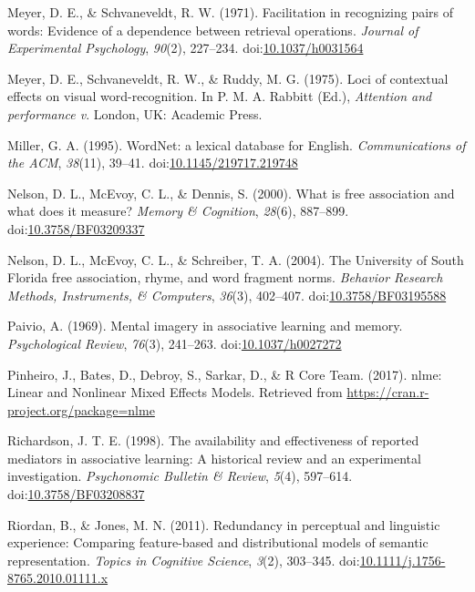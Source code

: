 \documentclass[english,man]{apa6}
\theoremstyle{definition}
\theoremstyle{definition}
\theoremstyle{definition}
\theoremstyle{remark}
\begin{document}
\hypertarget{ref-Meyer1971}{}
Meyer, D. E., \& Schvaneveldt, R. W. (1971). Facilitation in recognizing
pairs of words: Evidence of a dependence between retrieval operations.
\emph{Journal of Experimental Psychology}, \emph{90}(2), 227--234.
doi:\href{https://doi.org/10.1037/h0031564}{10.1037/h0031564}

\hypertarget{ref-Meyer1975}{}
Meyer, D. E., Schvaneveldt, R. W., \& Ruddy, M. G. (1975). Loci of
contextual effects on visual word-recognition. In P. M. A. Rabbitt
(Ed.), \emph{Attention and performance v}. London, UK: Academic Press.

\hypertarget{ref-Miller1995}{}
Miller, G. A. (1995). WordNet: a lexical database for English.
\emph{Communications of the ACM}, \emph{38}(11), 39--41.
doi:\href{https://doi.org/10.1145/219717.219748}{10.1145/219717.219748}

\hypertarget{ref-Nelson2000}{}
Nelson, D. L., McEvoy, C. L., \& Dennis, S. (2000). What is free
association and what does it measure? \emph{Memory \& Cognition},
\emph{28}(6), 887--899.
doi:\href{https://doi.org/10.3758/BF03209337}{10.3758/BF03209337}

\hypertarget{ref-Nelson2004}{}
Nelson, D. L., McEvoy, C. L., \& Schreiber, T. A. (2004). The University
of South Florida free association, rhyme, and word fragment norms.
\emph{Behavior Research Methods, Instruments, \& Computers},
\emph{36}(3), 402--407.
doi:\href{https://doi.org/10.3758/BF03195588}{10.3758/BF03195588}

\hypertarget{ref-Paivio1969}{}
Paivio, A. (1969). Mental imagery in associative learning and memory.
\emph{Psychological Review}, \emph{76}(3), 241--263.
doi:\href{https://doi.org/10.1037/h0027272}{10.1037/h0027272}

\hypertarget{ref-Pinheiro2017}{}
Pinheiro, J., Bates, D., Debroy, S., Sarkar, D., \& R Core Team. (2017).
nlme: Linear and Nonlinear Mixed Effects Models. Retrieved from
\url{https://cran.r-project.org/package=nlme}

\hypertarget{ref-Richardson1998}{}
Richardson, J. T. E. (1998). The availability and effectiveness of
reported mediators in associative learning: A historical review and an
experimental investigation. \emph{Psychonomic Bulletin \& Review},
\emph{5}(4), 597--614.
doi:\href{https://doi.org/10.3758/BF03208837}{10.3758/BF03208837}

\hypertarget{ref-Riordan2011}{}
Riordan, B., \& Jones, M. N. (2011). Redundancy in perceptual and
linguistic experience: Comparing feature-based and distributional models
of semantic representation. \emph{Topics in Cognitive Science},
\emph{3}(2), 303--345.
doi:\href{https://doi.org/10.1111/j.1756-8765.2010.01111.x}{10.1111/j.1756-8765.2010.01111.x}
\end{document}
